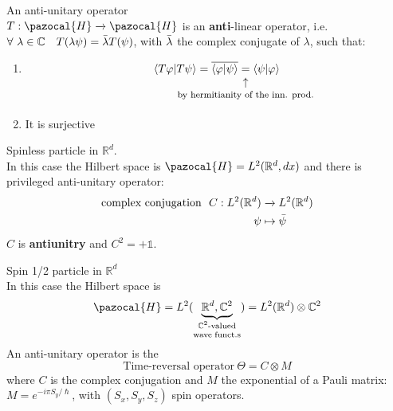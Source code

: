 \documentclass[../main.tex]{subfiles}
\begin{document}
\begin{definition}
An anti-unitary operator\\ $T:\pazocal{H}\xrightarrow[]{}\pazocal{H}$ is an \textbf{anti}-linear operator, i.e.
        \(
        \forall \ \lambda \in \mathbb{C} \quad T(\lambda\psi)=\Bar{\lambda}T(\psi)
        \), with $\Bar{\lambda}$ the complex conjugate of $\lambda$, such that:
    \begin{enumerate}
        \item 
        \[\langle T\varphi|T\psi \rangle=\overline{\langle \varphi|\psi \rangle}\underset{\mathclap{\tikz \node {$\uparrow$} node [below=1ex] {\footnotesize by hermitianity of the inn. prod.};}}{=}\langle \psi|\varphi \rangle\]
        \item It is surjective
    \end{enumerate}
\end{definition}
\begin{example}
Spinless particle in $\mathbb{R}^d$.\\
In this case the Hilbert space is $\pazocal{H}=L^2(\mathbb{R}^d,dx)$ and there is privileged anti-unitary operator: 
\[
\begin{split}
\mbox{complex conjugation }\  C:L^2(\mathbb{R}^d)&\xrightarrow[]{}L^2(\mathbb{R}^d)\\
\psi &\mapsto \Bar{\psi}
\end{split}
\]
$C$ is \textbf{antiunitry} and $C^2=+\mathbb{1}.$
\end{example}
\begin{example}
Spin 1/2 particle in $\mathbb{R}^d$\\
In this case the Hilbert space is \[\pazocal{H}=L^2(\underbrace{\mathbb{R}^d,\mathbb{C}^2}_\text{\parbox{1.5cm}{\centering$\mathbb{C}^2$-valued\\[-4pt]  wave funct.s}})=L^2(\mathbb{R}^d)\otimes \mathbb{C}^2\]
An anti-unitary operator is the
\[
\mbox{Time-reversal operator}\ \Theta=C \otimes M
\]
where $C$ is the complex conjugation and $M$ the exponential of a Pauli matrix: $M=e^{-i\pi S_y/\hslash}$, with $(S_x,S_y,S_z)$ spin operators.
\end{example}
\end{document}
